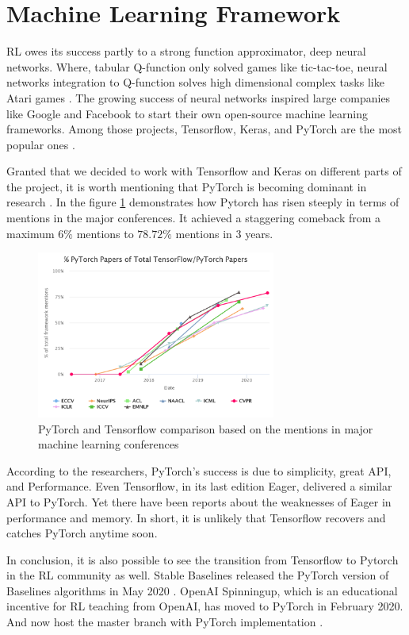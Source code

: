 \section{Machine Learning Framework}


RL owes its success partly to a strong function approximator, deep neural networks. Where, tabular Q-function only solved games like tic-tac-toe, neural networks integration to Q-function solves high dimensional complex tasks like Atari games \cite{Mnih}. The growing success of neural networks inspired large companies like Google and Facebook to start their own open-source machine learning frameworks. Among those projects, Tensorflow, Keras, and PyTorch are the most popular ones \cite{Tensoflow} \cite{Keras} \cite{PyTorch}. 

Granted that we decided to work with Tensorflow and Keras on different parts of the project, it is worth mentioning that PyTorch is becoming dominant in research \cite{Horace}. In the figure \ref{fig:ptvstf} demonstrates how Pytorch has risen steeply in terms of mentions in the major conferences. It achieved a staggering comeback from a maximum \(6\%\) mentions to \(78.72\%\) mentions in 3 years.  

\begin{figure}[htbp] 
    \centering
    \includegraphics[width=0.7\textwidth]{figures/tfvspytorch}
    \caption{PyTorch and Tensorflow comparison based on the mentions in major machine learning conferences \cite{Horace}}
    \label{fig:ptvstf}
\end{figure}


According to the researchers, PyTorch’s success is due to simplicity, great API, and Performance. Even Tensorflow, in its last edition Eager, delivered a similar API to PyTorch. Yet there have been reports about the weaknesses of Eager in performance and memory. In short, it is unlikely that Tensorflow recovers and catches PyTorch anytime soon.

In conclusion, it is also possible to see the transition from Tensorflow to Pytorch in the RL community as well. Stable Baselines released the PyTorch version of Baselines algorithms in May 2020 \cite{stable-baselines3}. OpenAI Spinningup, which is an educational incentive for RL teaching from OpenAI, has moved to PyTorch in February 2020. And now host the master branch with PyTorch implementation \cite{SpinningUp2018}.

 